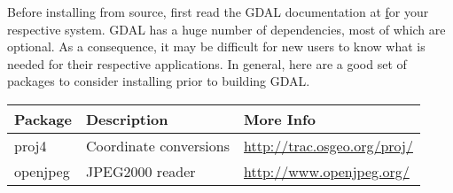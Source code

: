 Before installing from source, first read the GDAL documentation 
at \href{http://gdal.org} for your respective system.  GDAL 
has a huge number of dependencies, most of which are optional. 
As a consequence, it may be difficult for new users to know what is needed
for their respective applications.  In general, here are a good set of
packages to consider installing prior to building GDAL.

\begin{table}[h!]
\begin{tabular}{|l|l|l|}\hline
\textbf{Package} & \textbf{Description}   & \textbf{More Info} \\\hline
proj4            & Coordinate conversions & \url{http://trac.osgeo.org/proj/} \\\hline
openjpeg         & JPEG2000 reader        & \url{http://www.openjpeg.org/} \\\hline
\end{tabular}
\end{table}

